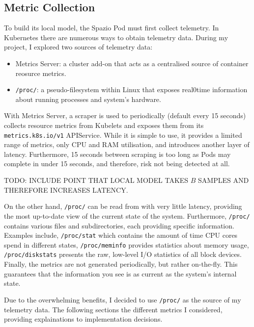 \subsection{Metric Collection}
To build its local model, the Spazio Pod must first collect telemetry. In
Kubernetes there are numerous ways to obtain telemetry data. During my project,
I explored two sources of telemetry data:
\begin{itemize}
    \item Metrics Server: a cluster add-on that acts as a centralised source of
        container reosurce metrics.
    \item \verb|/proc/|: a pseudo-filesystem within Linux that exposes real0time
        information about running processes and system's hardware.
\end{itemize}

With Metrics Server, a scraper is used to periodically (default every 15
seconds) collects resource metrics from Kubelets and exposes them from its
\verb|metrics.k8s.io/v1| APIService. While it is simple to use, it
provides a limited range of metrics, only CPU and RAM utilisation, and
introduces another layer of latency. Furthermore, 15 seconds between scraping is
too long as Pods may complete in under 15 seconds, and therefore, risk not being
detected at all.

TODO: INCLUDE POINT THAT LOCAL MODEL TAKES $B$ SAMPLES AND THEREFORE INCREASES
LATENCY.

On the other hand, \verb|/proc/| can be read from with very little latency,
providing the most up-to-date view of the current state of the system.
Furthermore, \verb|/proc/| contains various files and subdirectories, each
providing specific information. Examples include, \verb|/proc/stat| which
contains the amount of time CPU cores spend in different states,
\verb|/proc/meminfo| provides statistics about memory usage,
\verb|/proc/diskstats| presents the raw, low-level I/O statistics of all block
devices. Finally, the metrics are not generated periodically, but rather
on-the-fly. This guarantees that the information you see is as current as the
system's internal state.

Due to the overwhelming benefits, I decided to use \verb|/proc/| as the source
of my telemetry data. The following sections the different metrics I considered,
providing explainations to implementation decisions.


